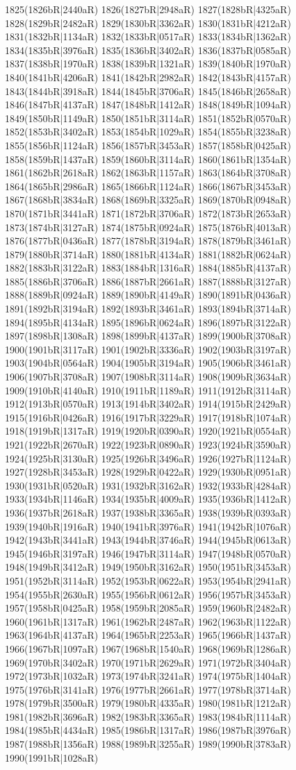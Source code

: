 1825(1826bR|2440aR) 1826(1827bR|2948aR) 1827(1828bR|4325aR) 1828(1829bR|2482aR) 1829(1830bR|3362aR) 1830(1831bR|4212aR) 1831(1832bR|1134aR) 1832(1833bR|0517aR) 1833(1834bR|1362aR) 1834(1835bR|3976aR) 1835(1836bR|3402aR) 1836(1837bR|0585aR) 1837(1838bR|1970aR) 1838(1839bR|1321aR) 1839(1840bR|1970aR) 1840(1841bR|4206aR) 1841(1842bR|2982aR) 1842(1843bR|4157aR) 1843(1844bR|3918aR) 1844(1845bR|3706aR) 1845(1846bR|2658aR) 1846(1847bR|4137aR) 1847(1848bR|1412aR) 1848(1849bR|1094aR) 1849(1850bR|1149aR) 1850(1851bR|3114aR) 1851(1852bR|0570aR) 1852(1853bR|3402aR) 1853(1854bR|1029aR) 1854(1855bR|3238aR) 1855(1856bR|1124aR) 1856(1857bR|3453aR) 1857(1858bR|0425aR) 1858(1859bR|1437aR) 1859(1860bR|3114aR) 1860(1861bR|1354aR) 1861(1862bR|2618aR) 1862(1863bR|1157aR) 1863(1864bR|3708aR) 1864(1865bR|2986aR) 1865(1866bR|1124aR) 1866(1867bR|3453aR) 1867(1868bR|3834aR) 1868(1869bR|3325aR) 1869(1870bR|0948aR) 1870(1871bR|3441aR) 1871(1872bR|3706aR) 1872(1873bR|2653aR) 1873(1874bR|3127aR) 1874(1875bR|0924aR) 1875(1876bR|4013aR) 1876(1877bR|0436aR) 1877(1878bR|3194aR) 1878(1879bR|3461aR) 1879(1880bR|3714aR) 1880(1881bR|4134aR) 1881(1882bR|0624aR) 1882(1883bR|3122aR) 1883(1884bR|1316aR) 1884(1885bR|4137aR) 1885(1886bR|3706aR) 1886(1887bR|2661aR) 1887(1888bR|3127aR) 1888(1889bR|0924aR) 1889(1890bR|4149aR) 1890(1891bR|0436aR) 1891(1892bR|3194aR) 1892(1893bR|3461aR) 1893(1894bR|3714aR) 1894(1895bR|4134aR) 1895(1896bR|0624aR) 1896(1897bR|3122aR) 1897(1898bR|1308aR) 1898(1899bR|4137aR) 1899(1900bR|3708aR) 1900(1901bR|3117aR) 1901(1902bR|3336aR) 1902(1903bR|3197aR) 1903(1904bR|0564aR) 1904(1905bR|3194aR) 1905(1906bR|3461aR) 1906(1907bR|3708aR) 1907(1908bR|3114aR) 1908(1909bR|3634aR) 1909(1910bR|4140aR) 1910(1911bR|1189aR) 1911(1912bR|3114aR) 1912(1913bR|0570aR) 1913(1914bR|3402aR) 1914(1915bR|2429aR) 1915(1916bR|0426aR) 1916(1917bR|3229aR) 1917(1918bR|1074aR) 1918(1919bR|1317aR) 1919(1920bR|0390aR) 1920(1921bR|0554aR) 1921(1922bR|2670aR) 1922(1923bR|0890aR) 1923(1924bR|3590aR) 1924(1925bR|3130aR) 1925(1926bR|3496aR) 1926(1927bR|1124aR) 1927(1928bR|3453aR) 1928(1929bR|0422aR) 1929(1930bR|0951aR) 1930(1931bR|0520aR) 1931(1932bR|3162aR) 1932(1933bR|4284aR) 1933(1934bR|1146aR) 1934(1935bR|4009aR) 1935(1936bR|1412aR) 1936(1937bR|2618aR) 1937(1938bR|3365aR) 1938(1939bR|0393aR) 1939(1940bR|1916aR) 1940(1941bR|3976aR) 1941(1942bR|1076aR) 1942(1943bR|3441aR) 1943(1944bR|3746aR) 1944(1945bR|0613aR) 1945(1946bR|3197aR) 1946(1947bR|3114aR) 1947(1948bR|0570aR) 1948(1949bR|3412aR) 1949(1950bR|3162aR) 1950(1951bR|3453aR) 1951(1952bR|3114aR) 1952(1953bR|0622aR) 1953(1954bR|2941aR) 1954(1955bR|2630aR) 1955(1956bR|0612aR) 1956(1957bR|3453aR) 1957(1958bR|0425aR) 1958(1959bR|2085aR) 1959(1960bR|2482aR) 1960(1961bR|1317aR) 1961(1962bR|2487aR) 1962(1963bR|1122aR) 1963(1964bR|4137aR) 1964(1965bR|2253aR) 1965(1966bR|1437aR) 1966(1967bR|1097aR) 1967(1968bR|1540aR) 1968(1969bR|1286aR) 1969(1970bR|3402aR) 1970(1971bR|2629aR) 1971(1972bR|3404aR) 1972(1973bR|1032aR) 1973(1974bR|3241aR) 1974(1975bR|1404aR) 1975(1976bR|3141aR) 1976(1977bR|2661aR) 1977(1978bR|3714aR) 1978(1979bR|3500aR) 1979(1980bR|4335aR) 1980(1981bR|1212aR) 1981(1982bR|3696aR) 1982(1983bR|3365aR) 1983(1984bR|1114aR) 1984(1985bR|4434aR) 1985(1986bR|1317aR) 1986(1987bR|3976aR) 1987(1988bR|1356aR) 1988(1989bR|3255aR) 1989(1990bR|3783aR) 1990(1991bR|1028aR) 